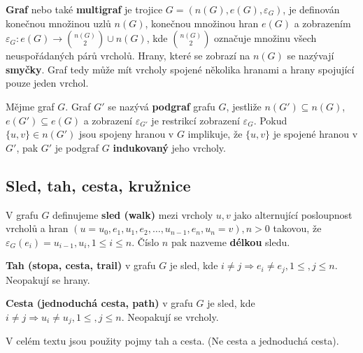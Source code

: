 \begin{definition}
\textbf{Graf} nebo také \textbf{multigraf} je trojice $G = (n(G), e(G), \varepsilon_G)$, je definován konečnou množinou uzlů $n(G)$, konečnou množinou hran $e(G)$ a zobrazením $\varepsilon_G : e(G) \rightarrow  { n(G) \choose 2 }  \cup n(G)$, kde ${ n(G) \choose 2 }$ označuje množinu všech neuspořádaných párů vrcholů. Hrany, které se zobrazí na $n(G)$ se nazývají \textbf{smyčky}. Graf tedy může mít vrcholy spojené několika hranami a hrany spojující pouze jeden vrchol.
\end{definition}

\begin{definition}
Mějme graf $G$. Graf $G'$ se nazývá \textbf{podgraf} grafu $G$, jestliže $n(G') \subseteq n(G)$, $e(G') \subseteq e(G)$ a zobrazení $\varepsilon_{G'}$ je restrikcí zobrazení $\varepsilon_G$. Pokud $\{ u, v \} \in n(G')$ jsou spojeny hranou v $G$ implikuje, že $\{ u, v \}$ je spojené hranou v $G'$, pak $G'$ je podgraf $G$ \textbf{indukovaný} jeho vrcholy.
\end{definition}

\subsection{Sled, tah, cesta, kružnice}

\begin{definition}
V grafu $G$ definujeme \textbf{sled (walk)} mezi vrcholy $u,v$ jako alternující posloupnost vrcholů a hran $(u = u_0, e_1, u_1, e_2, \ldots, u_{n-1}, e_n, u_n = v), n > 0$ takovou, že $\varepsilon_G (e_i) = {u_{i-1}, u_i}, 1 \leq i \leq n$. Číslo $n$ pak nazveme \textbf{délkou} sledu.
\end{definition}

\begin{definition}
\textbf{Tah (stopa, cesta, trail)} v grafu $G$ je sled, kde $i\neq j \Rightarrow e_i \neq e_j, 1 \leq , j \leq n $. Neopakují se hrany.
\end{definition}

\begin{definition}
\textbf{Cesta (jednoduchá cesta, path)} v grafu $G$ je sled, kde $i \neq j \Rightarrow u_i \neq u_j, 1 \leq , j \leq n $. Neopakují se vrcholy.
\end{definition}

V celém textu jsou použity pojmy tah a cesta. (Ne cesta a jednoduchá cesta).

